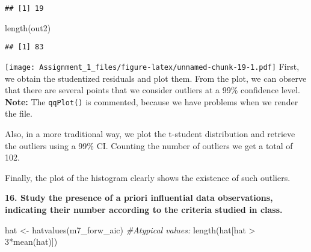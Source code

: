 \documentclass[
]{article}
\newenvironment{Shaded}{\begin{snugshade}}{\end{snugshade}}
\newcommand{\AttributeTok}[1]{\textcolor[rgb]{0.77,0.63,0.00}{#1}}
\newcommand{\CommentTok}[1]{\textcolor[rgb]{0.56,0.35,0.01}{\textit{#1}}}
\newcommand{\DecValTok}[1]{\textcolor[rgb]{0.00,0.00,0.81}{#1}}
\newcommand{\FunctionTok}[1]{\textcolor[rgb]{0.00,0.00,0.00}{#1}}
\newcommand{\NormalTok}[1]{#1}
\newcommand{\OtherTok}[1]{\textcolor[rgb]{0.56,0.35,0.01}{#1}}
\newcommand{\SpecialCharTok}[1]{\textcolor[rgb]{0.00,0.00,0.00}{#1}}
\begin{document}
\begin{verbatim}
## [1] 19
\end{verbatim}

\begin{Shaded}
\begin{Highlighting}[]
\FunctionTok{length}\NormalTok{(out2)}
\end{Highlighting}
\end{Shaded}

\begin{verbatim}
## [1] 83
\end{verbatim}

\begin{Shaded}
\end{Shaded}

\texttt{[image: Assignment\_1\_files/figure-latex/unnamed-chunk-19-1.pdf]}
First, we obtain the studentized residuals and plot them. From the plot,
we can observe that there are several points that we consider outliers
at a 99\% confidence level. \textbf{Note:} The \texttt{qqPlot()} is
commented, because we have problems when we render the file.

Also, in a more traditional way, we plot the t-student distribution and
retrieve the outliers using a 99\% CI. Counting the number of outliers
we get a total of 102.

Finally, the plot of the histogram clearly shows the existence of such
outliers.

\newpage

\textbf{16. Study the presence of a priori influential data observations, indicating their number according to the criteria studied in class.}

\begin{Shaded}
\begin{Highlighting}[]
\NormalTok{hat }\OtherTok{\textless{}{-}} \FunctionTok{hatvalues}\NormalTok{(m7\_forw\_aic)}
\CommentTok{\#Atypical values:}
\FunctionTok{length}\NormalTok{(hat[hat }\SpecialCharTok{\textgreater{}} \DecValTok{3}\SpecialCharTok{*}\FunctionTok{mean}\NormalTok{(hat)]) }
\end{Highlighting}
\end{Shaded}
\end{document}
